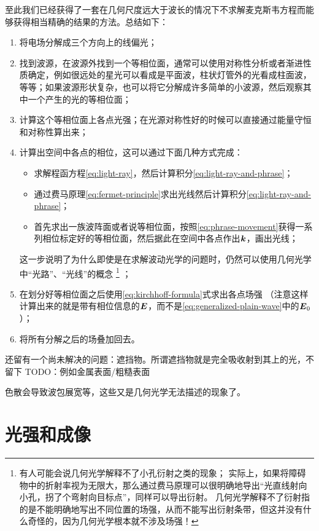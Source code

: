 至此我们已经获得了一套在几何尺度远大于波长的情况下不求解麦克斯韦方程而能够获得相当精确的结果的方法。总结如下：
\begin{enumerate}
    \item 将电场分解成三个方向上的线偏光；
    \item 找到波源，在波源外找到一个等相位面，通常可以使用对称性分析或者渐进性质确定，例如很远处的星光可以看成是平面波，柱状灯管外的光看成柱面波，等等；如果波源形状复杂，也可以将它分解成许多简单的小波源，然后观察其中一个产生的光的等相位面；
    \item 计算这个等相位面上各点光强；在光源对称性好的时候可以直接通过能量守恒和对称性算出来；
    \item 计算出空间中各点的相位，这可以通过下面几种方式完成：
    \begin{itemize}
        \item 求解程函方程\eqref{eq:light-ray}，然后计算积分\eqref{eq:light-ray-and-phrase}；
        \item 通过费马原理\eqref{eq:fermet-principle}求出光线然后计算积分\eqref{eq:light-ray-and-phrase}；
        \item 首先求出一族波阵面或者说等相位面，按照\eqref{eq:phrase-movement}获得一系列相位标定好的等相位面，然后据此在空间中各点作出$\vb*{k}$，画出光线；
    \end{itemize}
    这一步说明了为什么即使是在求解波动光学的问题时，仍然可以使用几何光学中“光路”、“光线”的概念%
    \footnote{有人可能会说几何光学解释不了小孔衍射之类的现象；
    实际上，如果将障碍物中的折射率视为无限大，那么通过费马原理可以很明确地导出“光直线射向小孔，拐了个弯射向目标点”，同样可以导出衍射。
    几何光学解释不了衍射指的是不能明确地写出不同位置的场强，从而不能写出衍射条带，但这并没有什么奇怪的，因为几何光学根本就不涉及场强！}
    ；
    \item 在划分好等相位面之后使用\eqref{eq:kirchhoff-formula}式求出各点场强
    （注意这样计算出来的就是带有相位信息的$\vb*{E}$，而不是\eqref{eq:generalized-plain-wave}中的$\vb*{E}_0$）；
    \item 将所有分解之后的场叠加回去。
\end{enumerate}

还留有一个尚未解决的问题：遮挡物。所谓遮挡物就是完全吸收射到其上的光，不留下
TODO：例如金属表面/粗糙表面

色散会导致波包展宽等，这些又是几何光学无法描述的现象了。

\section{光强和成像}

